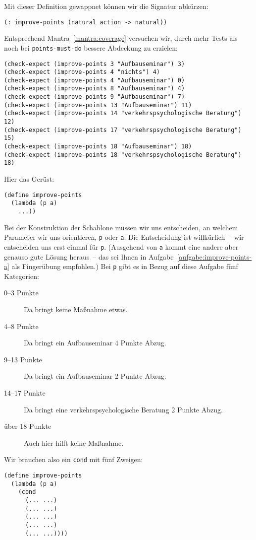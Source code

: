 Mit dieser Definition gewappnet können wir die Signatur abkürzen:
%
\begin{verbatim}
(: improve-points (natural action -> natural)) 
\end{verbatim}
%
Entsprechend Mantra~\ref{mantra:coverage} versuchen wir, durch mehr
Tests als noch bei \texttt{points-must-do} bessere Abdeckung zu
erzielen:\label{page:improve-points-tests}
%
\begin{verbatim}
(check-expect (improve-points 3 "Aufbauseminar") 3)
(check-expect (improve-points 4 "nichts") 4)
(check-expect (improve-points 4 "Aufbauseminar") 0)
(check-expect (improve-points 8 "Aufbauseminar") 4)
(check-expect (improve-points 9 "Aufbauseminar") 7)
(check-expect (improve-points 13 "Aufbauseminar") 11)
(check-expect (improve-points 14 "verkehrspsychologische Beratung") 12)
(check-expect (improve-points 17 "verkehrspsychologische Beratung") 15)
(check-expect (improve-points 18 "Aufbauseminar") 18)
(check-expect (improve-points 18 "verkehrspsychologische Beratung") 18)
\end{verbatim}
%
Hier das Gerüst:
%
\begin{verbatim}
(define improve-points
  (lambda (p a)
    ...))
\end{verbatim}
%
Bei der Konstruktion der Schablone müssen wir uns entscheiden, an
welchem Parameter wir uns orientieren, \texttt{p} oder \texttt{a}.
Die Entscheidung ist willkürlich~-- wir entscheiden uns erst einmal
für \texttt{p}.  (Ausgehend von \texttt{a} kommt eine andere aber
genauso gute Lösung heraus~-- das sei Ihnen in
Aufgabe~\ref{aufgabe:improve-points-a} als Fingerübung empfohlen.)
Bei \texttt{p} gibt es in Bezug auf diese Aufgabe fünf Kategorien:
%
\begin{description}
\item[0--3 Punkte] Da bringt keine Maßnahme etwas.
\item[4--8 Punkte] Da bringt ein Aufbauseminar 4 Punkte Abzug.
\item[9--13 Punkte] Da bringt ein Aufbauseminar 2 Punkte Abzug.
\item[14--17 Punkte] Da bringt eine verkehrspsychologische Beratung 2
  Punkte Abzug.
\item[über 18 Punkte] Auch hier hilft keine Maßnahme.
\end{description}
%
Wir brauchen also ein \texttt{cond} mit fünf Zweigen:
%
\begin{verbatim}
(define improve-points
  (lambda (p a)
    (cond
      (... ...)
      (... ...)
      (... ...)
      (... ...)
      (... ...))))
\end{verbatim}

